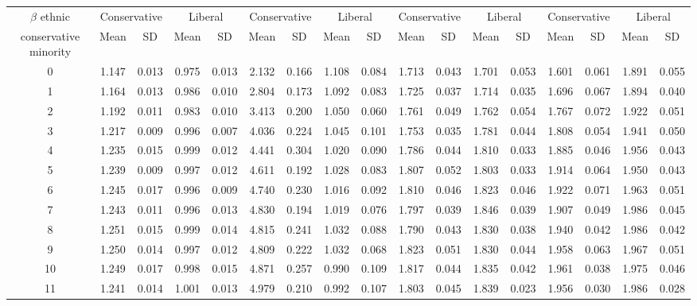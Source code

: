 \documentclass{article}
\begin{document}
\begin{table}[H]
{\begin{tabular}{|c|c|c|c|c|c|c|c|c|c|c|c|c|c|c|c|c|}
 $\beta$ ethnic & \multicolumn{2}{|c|}{Conservative} & \multicolumn{2}{|c|}{Liberal} 
& \multicolumn{2}{|c|}{Conservative} & \multicolumn{2}{|c|}{Liberal} & \multicolumn{2}{|c|}{Conservative} & \multicolumn{2}{|c|}{Liberal} 
& \multicolumn{2}{|c|}{Conservative} & \multicolumn{2}{|c|}{Liberal}\\
 conservative minority & Mean & SD & Mean & SD & Mean & SD & Mean & SD & Mean & SD & Mean & SD & Mean & SD & Mean & SD\\
 \hline
   0 & 1.147 & 0.013 & 0.975 & 0.013 & 2.132 & 0.166 & 1.108 & 0.084 & 1.713 & 0.043 & 1.701 & 0.053 & 1.601 & 0.061 & 1.891 & 0.055 \\ 
     1 & 1.164 & 0.013 & 0.986 & 0.010 & 2.804 & 0.173 & 1.092 & 0.083 & 1.725 & 0.037 & 1.714 & 0.035 & 1.696 & 0.067 & 1.894 & 0.040 \\ 
     2 & 1.192 & 0.011 & 0.983 & 0.010 & 3.413 & 0.200 & 1.050 & 0.060 & 1.761 & 0.049 & 1.762 & 0.054 & 1.767 & 0.072 & 1.922 & 0.051 \\ 
     3 & 1.217 & 0.009 & 0.996 & 0.007 & 4.036 & 0.224 & 1.045 & 0.101 & 1.753 & 0.035 & 1.781 & 0.044 & 1.808 & 0.054 & 1.941 & 0.050 \\ 
     4 & 1.235 & 0.015 & 0.999 & 0.012 & 4.441 & 0.304 & 1.020 & 0.090 & 1.786 & 0.044 & 1.810 & 0.033 & 1.885 & 0.046 & 1.956 & 0.043 \\ 
     5 & 1.239 & 0.009 & 0.997 & 0.012 & 4.611 & 0.192 & 1.028 & 0.083 & 1.807 & 0.052 & 1.803 & 0.033 & 1.914 & 0.064 & 1.950 & 0.043 \\ 
     6 & 1.245 & 0.017 & 0.996 & 0.009 & 4.740 & 0.230 & 1.016 & 0.092 & 1.810 & 0.046 & 1.823 & 0.046 & 1.922 & 0.071 & 1.963 & 0.051 \\ 
     7 & 1.243 & 0.011 & 0.996 & 0.013 & 4.830 & 0.194 & 1.019 & 0.076 & 1.797 & 0.039 & 1.846 & 0.039 & 1.907 & 0.049 & 1.986 & 0.045 \\ 
     8 & 1.251 & 0.015 & 0.999 & 0.014 & 4.815 & 0.241 & 1.032 & 0.088 & 1.790 & 0.043 & 1.830 & 0.038 & 1.940 & 0.042 & 1.986 & 0.042 \\ 
     9 & 1.250 & 0.014 & 0.997 & 0.012 & 4.809 & 0.222 & 1.032 & 0.068 & 1.823 & 0.051 & 1.830 & 0.044 & 1.958 & 0.063 & 1.967 & 0.051 \\ 
    10 & 1.249 & 0.017 & 0.998 & 0.015 & 4.871 & 0.257 & 0.990 & 0.109 & 1.817 & 0.044 & 1.835 & 0.042 & 1.961 & 0.038 & 1.975 & 0.046 \\ 
    11 & 1.241 & 0.014 & 1.001 & 0.013 & 4.979 & 0.210 & 0.992 & 0.107 & 1.803 & 0.045 & 1.839 & 0.023 & 1.956 & 0.030 & 1.986 & 0.028 \\ 

\end{tabular}}
\end{table}
\end{document}
